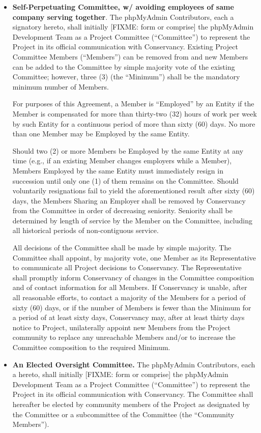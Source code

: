 \documentclass[letterpaper,12pt]{article}
\newcommand{\signatories}{phpMyAdmin Contributors\xspace}
\newcommand{\leadershipbody}{phpMyAdmin Development Team\xspace}
\begin{document}
\begin{enumerate}[label=\arabic*.,ref=\S~\arabic*]
\begin{itemize}
\item \textbf{Self-Perpetuating Committee, w/ avoiding employees of same
company serving together}. The \signatories, each a signatory
hereto, shall initially [FIXME: form or comprise] the \leadershipbody
as a Project Committee (``Committee'') to represent the Project
in its official communication with Conservancy. Existing Project
Committee Members (``Members'') can be removed from and new Members
can be added to the Committee by simple majority vote of the existing
Committee; however, three (3) (the ``Minimum'') shall be the mandatory
minimum number of Members.


For purposes of this Agreement, a Member is ``Employed'' by an Entity
if the Member is compensated for more than thirty-two (32) hours of
work per week by such Entity for a continuous period of more than
sixty (60) days. No more than one Member may be Employed by the same
Entity.


Should two (2) or more Members be Employed by the same Entity at any
time (e.g., if an existing Member changes employers while a Member),
Members Employed by the same Entity must immediately resign in succession
until only one (1) of them remains on the Committee. Should voluntarily
resignations fail to yield the aforementioned result after sixty (60)
days, the Members Sharing an Employer shall be removed by Conservancy
from the Committee in order of decreasing seniority. Seniority shall
be determined by length of service by the Member on the Committee,
including all historical periods of non-contiguous service.


All decisions of the Committee shall be made by simple majority. The
Committee shall appoint, by majority vote, one Member as its Representative
to communicate all Project decisions to Conservancy. The Representative
shall promptly inform Conservancy of changes in the Committee composition
and of contact information for all Members. If Conservancy is unable,
after all reasonable efforts, to contact a majority of the Members
for a period of sixty (60) days, or if the number of Members is fewer
than the Minimum for a period of at least sixty days, Conservancy
may, after at least thirty days notice to Project, unilaterally appoint
new Members from the Project community to replace any unreachable
Members and/or to increase the Committee composition to the required
Minimum.

\item \textbf{An Elected Oversight Committee.} The \signatories, each
a hereto, shall initially [FIXME: form or comprise] the 
\leadershipbody as a Project Committee (``Committee'') to 
represent the Project in its official communication with Conservancy.  The
Committee shall hereafter be elected by community members of the Project as
designated by the Committee or a subcommittee of the Committee (the 
``Community Members'').  


\end{itemize}
\end{enumerate}
\end{document}
